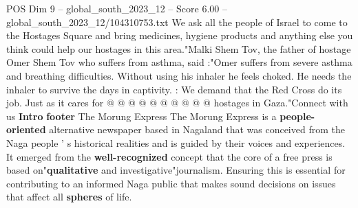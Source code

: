 \begin{textsample}{POS Dim 9 – global\_south\_2023\_12 – Score 6.00 – global\_south\_2023\_12/104310753.txt}
We ask all the people of Israel to come to the Hostages Square and bring medicines, hygiene products and anything else you think could help our hostages in this area."Malki Shem Tov, the father of hostage Omer Shem Tov who suffers from asthma, said :"Omer suffers from severe asthma and breathing difficulties.
Without using his inhaler he feels choked.
He needs the inhaler to survive the days in captivity. : We demand that the Red Cross do its job.
Just as it cares for @ @ @ @ @ @ @ @ @ @ hostages in Gaza."Connect with us \textbf{Intro} \textbf{footer} The Morung Express The Morung Express is a \textbf{people-oriented} alternative newspaper based in Nagaland that was conceived from the Naga people ' s historical realities and is guided by their voices and experiences.
It emerged from the \textbf{well-recognized} concept that the core of a free press is based on"\textbf{qualitative} and investigative"journalism.
Ensuring this is essential for contributing to an informed Naga public that makes sound decisions on issues that affect all \textbf{spheres} of life.

\end{textsample}
